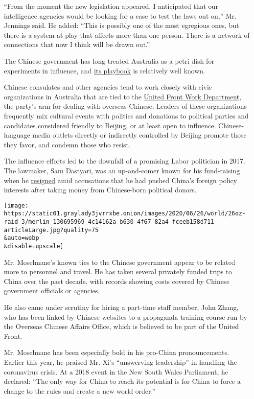 ``From the moment the new legislation appeared, I anticipated that our
intelligence agencies would be looking for a case to test the laws out
on,'' Mr. Jennings said. He added: ``This is possibly one of the most
egregious ones, but there is a system at play that affects more than one
person. There is a network of connections that now I think will be drawn
out.''

The Chinese government has long treated Australia as a petri dish for
experiments in influence, and
\href{https://www.nytimes3xbfgragh.onion/2019/05/20/world/australia/australia-china.html}{its
playbook} is relatively well known.

Chinese consulates and other agencies tend to work closely with civic
organizations in Australia that are tied to the
\href{http://www.zytzb.gov.cn/}{United Front Work Department}, the
party's arm for dealing with overseas Chinese. Leaders of these
organizations frequently mix cultural events with politics and donations
to political parties and candidates considered friendly to Beijing, or
at least open to influence. Chinese-language media outlets directly or
indirectly controlled by Beijing promote those they favor, and condemn
those who resist.

The influence efforts led to the downfall of a promising Labor
politician in 2017. The lawmaker, Sam Dastyari, was an up-and-comer
known for his fund-raising when he
\href{https://www.nytimes3xbfgragh.onion/2017/12/12/world/australia/sam-dastyari-resigns-china.html}{resigned}
amid accusations that he had pushed China's foreign policy interests
after taking money from Chinese-born political donors.

\texttt{[image: https://static01.graylady3jvrrxbe.onion/images/2020/06/26/world/26oz-raid-3/merlin\_130695969\_4c14162a-b630-4f67-82a4-fceeb158d711-articleLarge.jpg?quality=75\\\&auto=webp\\\&disable=upscale]}

Mr. Moselmane's known ties to the Chinese government appear to be
related more to personnel and travel. He has taken several privately
funded trips to China over the past decade, with records showing costs
covered by Chinese government officials or agencies.

He also came under scrutiny for hiring a part-time staff member, John
Zhang, who has been linked by Chinese websites to a propaganda training
course run by the Overseas Chinese Affairs Office, which is believed to
be part of the United Front.

Mr. Moselmane has been especially bold in his pro-China pronouncements.
Earlier this year, he praised Mr. Xi's ``unswerving leadership'' in
handling the coronavirus crisis. At a 2018 event in the New South Wales
Parliament, he declared: ``The only way for China to reach its potential
is for China to force a change to the rules and create a new world
order.''

